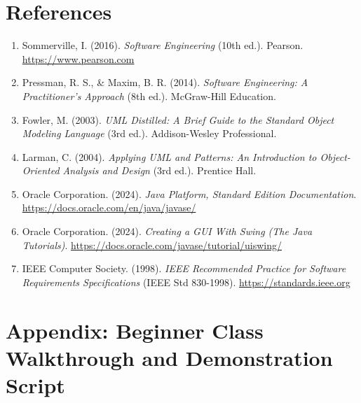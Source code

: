 \documentclass[11pt,a4paper]{article}
\begin{document}
\section{References}
\begin{enumerate}
    \item Sommerville, I. (2016). \textit{Software Engineering} (10th ed.). Pearson. \url{https://www.pearson.com}
    \item Pressman, R. S., \& Maxim, B. R. (2014). \textit{Software Engineering: A Practitioner's Approach} (8th ed.). McGraw-Hill Education.
    \item Fowler, M. (2003). \textit{UML Distilled: A Brief Guide to the Standard Object Modeling Language} (3rd ed.). Addison-Wesley Professional.
    \item Larman, C. (2004). \textit{Applying UML and Patterns: An Introduction to Object-Oriented Analysis and Design} (3rd ed.). Prentice Hall.
    \item Oracle Corporation. (2024). \textit{Java Platform, Standard Edition Documentation}. \url{https://docs.oracle.com/en/java/javase/}
    \item Oracle Corporation. (2024). \textit{Creating a GUI With Swing (The Java Tutorials)}. \url{https://docs.oracle.com/javase/tutorial/uiswing/}
    \item IEEE Computer Society. (1998). \textit{IEEE Recommended Practice for Software Requirements Specifications} (IEEE Std 830-1998). \url{https://standards.ieee.org}
\end{enumerate}

\appendix
\section{Appendix: Beginner Class Walkthrough and Demonstration Script}
\end{document}
